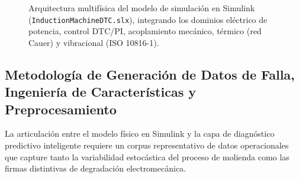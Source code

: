 \documentclass[conference]{IEEEtran}
\begin{document}
\begin{figure}[!t]
{%
    }
    \caption{Arquitectura multif\'isica del modelo de simulaci\'on en Simulink (\texttt{InductionMachineDTC.slx}), integrando los dominios el\'ectrico de potencia, control DTC/PI, acoplamiento mec\'anico, t\'ermico (red Cauer) y vibracional (ISO 10816-1).}
    \label{fig:circuito}
\end{figure}

\subsection{Metodología de Generación de Datos de Falla, Ingeniería de Características y Preprocesamiento}
\label{sec:metodologia_datos}
La articulación entre el modelo físico en Simulink y la capa de diagnóstico predictivo inteligente requiere un corpus representativo de datos operacionales que capture tanto la variabilidad estocástica del proceso de molienda como las firmas distintivas de degradación electromecánica.
\end{document}
